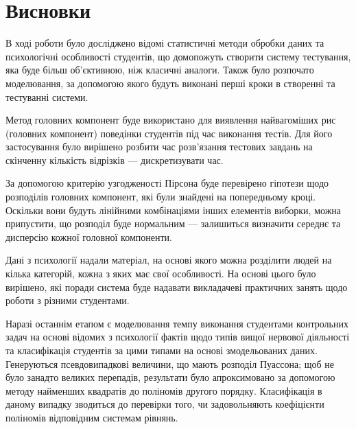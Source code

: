 \chapter*{Висновки}

В ході роботи було досліджено відомі статистичні методи обробки даних
та психологічні особливості студентів, що домопожуть створити систему
тестування, яка буде більш об’єктивною, ніж класичні аналоги.
Також було розпочато моделювання, за допомогою якого будуть виконані
перші кроки в створенні та тестуванні системи.

Метод головних компонент буде використано для виявлення найвагоміших
рис (головних компонент) поведінки студентів під час виконання тестів.
Для його застосування було вирішено розбити час розв’язання тестових завдань
на скінченну кількість відрізків --- дискретизувати час.

За допомогою критерію узгодженості Пірсона буде перевірено гіпотези щодо
розподілів головних компонент, які були знайдені на попередньому кроці.
Оскільки вони будуть лінійними комбінаціями інших елементів виборки, можна
припустити, що розподіл буде нормальним --- залишиться визначити середнє
та дисперсію кожної головної компоненти.

Дані з психології надали матеріал, на основі якого можна розділити людей
на кілька категорій, кожна з яких має свої особливості.
На основі цього було вирішено, які поради система буде надавати викладачеві
практичних занять щодо роботи з різними студентами.

Наразі останнім етапом є моделювання темпу виконання студентами контрольних
задач на основі відомих з психології фактів щодо типів вищої нервової
діяльності та класифікація студентів за цими типами на основі змодельованих
даних.
Генеруються псевдовипадкові величини, що мають розподіл Пуассона;
щоб не було занадто великих перепадів, результати було апроксимовано за
допомогою методу найменших квадратів до поліномів другого порядку.
Класифікація в даному випадку зводиться до перевірки того, чи задовольняють
коефіцієнти поліномів відповідним системам рівнянь.
